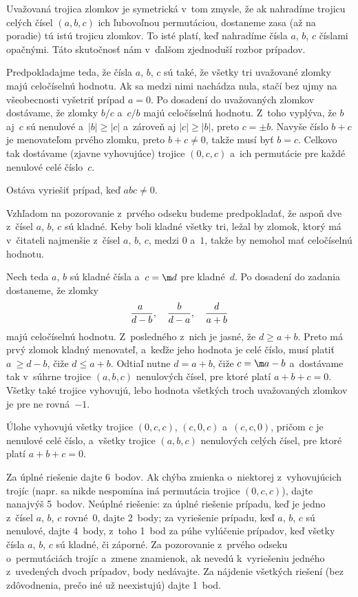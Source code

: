{%
Uvažovaná trojica zlomkov je symetrická v~tom zmysle, že ak nahradíme trojicu
celých čísel $(a, b, c)$ ich ľubovoľnou permutáciou, dostaneme zasa
(až na poradie) tú istú trojicu zlomkov. To isté platí, keď nahradíme čísla $a$, $b$, $c$
číslami opačnými. Táto skutočnosť nám v~ďalšom zjednoduší rozbor prípadov.

Predpokladajme teda, že čísla $a$, $b$, $c$ sú také, že všetky tri
uvažované zlomky majú celočíselnú hodnotu.
Ak sa medzi nimi nachádza nula, stačí bez ujmy na
všeobecnosti vyšetriť prípad $a=0$.
Po dosadení do uvažovaných zlomkov dostávame, že zlomky $b / c$
a~$c / b$ majú celočíselnú hodnotu. Z~toho vyplýva, že $b$ aj~$c$ sú
nenulové a~$|b|\ge |c|$ a~zároveň aj $|c| \ge |b|$, preto $c = {\pm b}$. Navyše
číslo $b+c$ je menovateľom prvého zlomku, preto $b+c \ne 0$, takže
musí byť $b=c$. Celkovo tak dostávame (zjavne
vyhovujúce) trojice $(0, c, c)$ a~ich permutácie pre každé nenulové
celé číslo~$c$.

Ostáva vyriešiť prípad, keď $abc \ne 0$.

Vzhľadom na pozorovanie z~prvého odseku budeme predpokladať, že aspoň
dve z~čísel $a$, $b$, $c$ sú kladné. Keby boli kladné všetky tri,
ležal by zlomok, ktorý má v~čitateli najmenšie z~čísel $a$, $b$, $c$, medzi $0$ a~$1$, takže by nemohol mať celočíselnú hodnotu.

Nech teda $a$, $b$ sú kladné čísla a~$c =\m d$ pre kladné~$d$.
Po dosadení do zadania dostaneme, že zlomky
$$
{a~\over d-b},\quad {b \over d-a},\quad {d \over a+b}
$$
majú celočíselnú hodnotu. Z~posledného z~nich je jasné, že $d \ge a+b$.
Preto má prvý zlomok kladný menovateľ, a~keďže jeho hodnota je celé
číslo, musí platiť $a~\ge d-b$, čiže $d \le a+b$.
Odtiaľ nutne $d = a+b$, čiže $c=\m a-b$ a~dostávame tak v~súhrne
trojice $(a, b, c)$ nenulových čísel, pre ktoré platí $a+b+c = 0$. Všetky
také trojice vyhovujú, lebo hodnota všetkých troch uvažovaných zlomkov
je pre ne rovná~${-1}$.

\odpoved
Úlohe vyhovujú všetky trojice $(0, c, c)$, $(c, 0, c)$ a~$(c, c, 0)$,
pričom $c$ je nenulové celé číslo, a~všetky trojice $(a, b, c)$ nenulových celých čísel,
pre ktoré platí $a+b+c = 0$.

\nobreak\medskip\petit\noindent
Za úplné riešenie dajte 6~bodov.
Ak chýba zmienka o~niektorej
z~vyhovujúcich trojíc (napr. sa nikde nespomína iná permutácia
trojice $(0, c, c)$), dajte nanajvýš 5~bodov.
Neúplné riešenie: za úplné riešenie prípadu, keď je jedno z~čísel $a$,
$b$, $c$ rovné~$0$, dajte 2~body; za vyriešenie prípadu, keď $a$, $b$,
$c$ sú nenulové, dajte 4~body, z~toho 1~bod za púhe vylúčenie prípadov,
keď všetky čísla $a$, $b$, $c$ sú kladné, či záporné.
Za pozorovanie z~prvého odseku o~permutáciách trojíc a~zmene znamienok,
ak nevedú k~vyriešeniu jedného z~uvedených dvoch prípadov, body nedávajte.
Za nájdenie všetkých riešení (bez zdôvodnenia, prečo iné už neexistujú) dajte 1~bod.
\endpetit
\bigbreak
}

